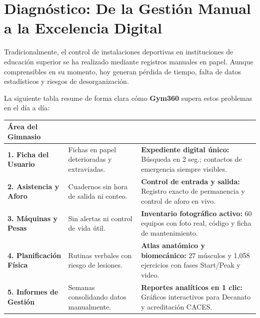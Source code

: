 \documentclass[11pt,a4paper]{article}
\begin{document}
\newpage

\section{Diagnóstico: De la Gestión Manual a la Excelencia Digital}

Tradicionalmente, el control de instalaciones deportivas en instituciones de educación superior se ha realizado mediante registros manuales en papel. Aunque comprensibles en su momento, hoy generan pérdida de tiempo, falta de datos estadísticos y riesgos de desorganización. 

La siguiente tabla resume de forma clara cómo \textbf{Gym360} supera estos problemas en el día a día:

\vspace{1mm}
\begin{center}
\renewcommand{\arraystretch}{1.1}
\begin{tabularx}{\linewidth}{@{}>{\raggedright\bfseries\color{UtlvteNavy}}p{2.6cm} >{\raggedright\small}X >{\raggedright\arraybackslash\small}X@{}}
\toprule
\textbf{\normalsize Área del Gimnasio} & \textbf{\normalsize \color{TextMuted}{Gestión Manual Tradicional}} & \textbf{\normalsize \color{GymSecondary}{Solución Inteligente con Gym360}} \\
\midrule
\textbf{1. Ficha del Usuario} & Fichas en papel deterioradas y extraviadas. & \textbf{Expediente digital único:} Búsqueda en 2 seg.; contactos de emergencia siempre visibles. \\
\addlinespace
\textbf{2. Asistencia y Aforo} & Cuadernos sin hora de salida ni conteo. & \textbf{Control de entrada y salida:} Registro exacto de permanencia y control de aforo en vivo. \\
\addlinespace
\textbf{3. Máquinas y Pesas} & Sin alertas ni control de vida útil. & \textbf{Inventario fotográfico activo:} 60 equipos con foto real, código y ficha de mantenimiento. \\
\addlinespace
\textbf{4. Planificación Física} & Rutinas verbales con riesgo de lesiones. & \textbf{Atlas anatómico y biomecánico:} 27 músculos y 1,058 ejercicios con fases Start/Peak y video. \\
\addlinespace
\textbf{5. Informes de Gestión} & Semanas consolidando datos manualmente. & \textbf{Reportes analíticos en 1 clic:} Gráficos interactivos para Decanato y acreditación CACES. \\
\bottomrule
\end{tabularx}
\end{center}
\end{document}
